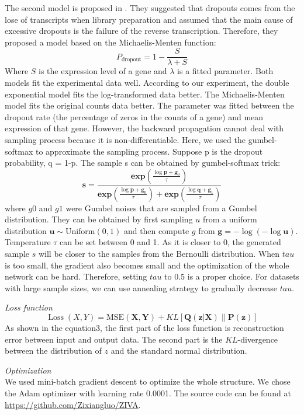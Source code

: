 The second model is proposed in \cite{andrews2017modelling}. They suggested that dropouts comes from the lose of transcripts when library preparation and assumed that the main cause of excessive dropouts is the failure of the reverse transcription. Therefore, they proposed a model based on the Michaelis-Menten function:
\begin{equation}
    P_{\text {dropout}}=1-\frac{S}{\lambda+S}
\end{equation}
Where $S$ is the expression level of a gene and $\lambda$ is a fitted parameter. 
Both models fit the experimental data well. According to our experiment, the double exponential model fits the log-transformed data better. The Michaelis-Menten model fits the original counts data better. 
The parameter was fitted between the dropout rate (the percentage of zeros in the counts of a gene) and mean expression of that gene.
However, the backward propagation cannot deal with sampling process because it is non-differentiable. Here, we used the gumbel-softmax \cite{jang2016categorical} to approximate the sampling process. Suppose p is the dropout probability, q = 1-p. The sample s can be obtained by gumbel-softmax trick:
\begin{equation}
    \boldsymbol{s}=\frac{\boldsymbol{e} \boldsymbol{x} \boldsymbol{p}\left(\frac{\log \boldsymbol{p}+\boldsymbol{g}_{0}}{\tau}\right)}{\boldsymbol{e x p}\left(\frac{\log \boldsymbol{p}+\boldsymbol{g}_{0}}{\tau}\right)+\boldsymbol{e} \boldsymbol{x} \boldsymbol{p}\left(\frac{\log \boldsymbol{q}+\boldsymbol{g}_{1}}{\tau}\right)}
\end{equation}
where $g0$ and $g1$ were Gumbel noises that are sampled from a Gumbel distribution. They can be obtained by first sampling $u$ from a uniform distribution $\boldsymbol{u} \sim \text {Uniform}(0,1)$ and then compute $g$ from $\boldsymbol{g}=-\log (-\log \boldsymbol{u})$. Temperature $\tau$ can be set between 0 and 1. As it is closer to 0, the generated sample $s$ will be closer to the samples from the Bernoulli distribution. When $tau$ is too small, the gradient also becomes small and the optimization of the whole network can be hard. Therefore, setting $tau$ to 0.5 is a proper choice. For datasets with large sample sizes, we can use annealing strategy to gradually decrease $tau$.

\vspace{0.5cm}
\noindent\emph{Loss function} \\
\begin{equation}
    \operatorname{Loss}(X, Y)=\text {MSE}(\boldsymbol{X}, \boldsymbol{Y}) + 
    KL[\boldsymbol{Q}(\boldsymbol{z} | \boldsymbol{X}) \| \boldsymbol{P}(\boldsymbol{z})] 
\end{equation}
As shown in the equation3, the first part of the loss function is reconstruction error between input and output data. The second part is the $KL$-divergence between the distribution of $z$ and the standard normal distribution. 

\vspace{0.5cm}
\noindent\emph{Optimization} \\
We used mini-batch gradient descent to optimize the whole structure. We chose the Adam optimizer with learning rate 0.0001. The source code can be found at \url{https://github.com/Zixiangluo/ZIVA}.

